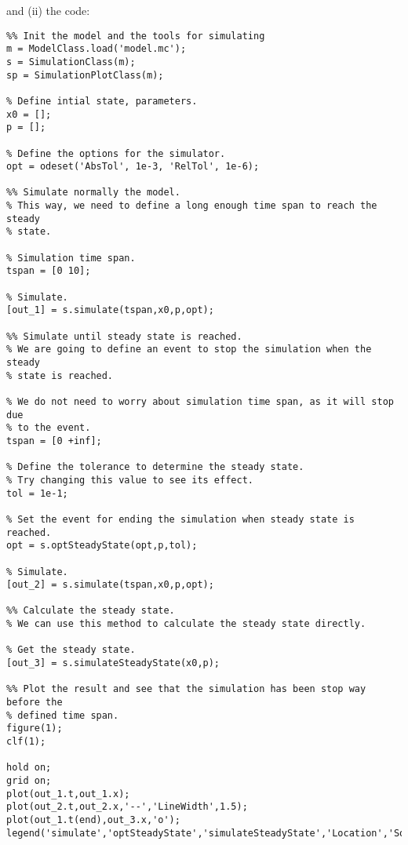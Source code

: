 \documentclass[11pt]{article}
\begin{document}
and (ii) the  code:

\begin{lstlisting}
%% Init the model and the tools for simulating
m = ModelClass.load('model.mc');
s = SimulationClass(m);
sp = SimulationPlotClass(m);

% Define intial state, parameters.
x0 = [];
p = [];

% Define the options for the simulator.
opt = odeset('AbsTol', 1e-3, 'RelTol', 1e-6);

%% Simulate normally the model.
% This way, we need to define a long enough time span to reach the steady
% state.

% Simulation time span.
tspan = [0 10]; 

% Simulate.
[out_1] = s.simulate(tspan,x0,p,opt);

%% Simulate until steady state is reached.
% We are going to define an event to stop the simulation when the steady
% state is reached.

% We do not need to worry about simulation time span, as it will stop due
% to the event.
tspan = [0 +inf]; 

% Define the tolerance to determine the steady state.
% Try changing this value to see its effect.
tol = 1e-1;

% Set the event for ending the simulation when steady state is reached.
opt = s.optSteadyState(opt,p,tol);

% Simulate.
[out_2] = s.simulate(tspan,x0,p,opt);

%% Calculate the steady state.
% We can use this method to calculate the steady state directly.

% Get the steady state.
[out_3] = s.simulateSteadyState(x0,p);

%% Plot the result and see that the simulation has been stop way before the 
% defined time span.
figure(1);
clf(1);

hold on;
grid on;
plot(out_1.t,out_1.x);
plot(out_2.t,out_2.x,'--','LineWidth',1.5);
plot(out_1.t(end),out_3.x,'o');
legend('simulate','optSteadyState','simulateSteadyState','Location','SouthEast');
\end{lstlisting}
\end{document}
